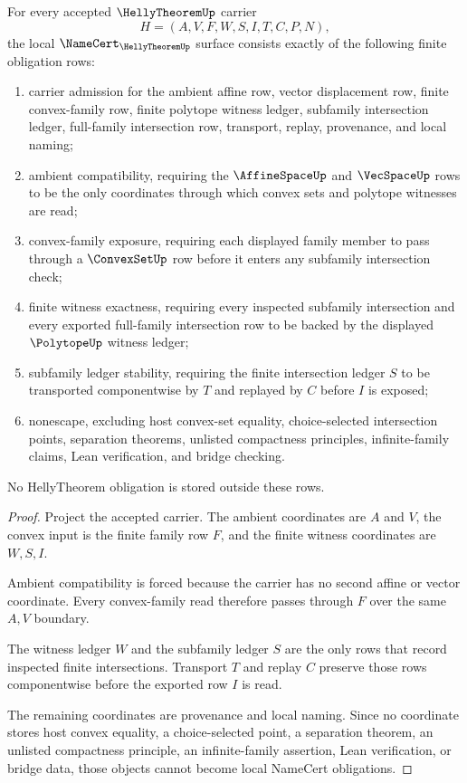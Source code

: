 \begin{theorem}\label{thm:helly-theorem-namecert-obligations}
For every accepted $\HellyTheoremUp$ carrier
$$
H=(A,V,F,W,S,I,T,C,P,N),
$$
the local $\NameCert_{\HellyTheoremUp}$ surface consists exactly of the following finite obligation rows:
\begin{enumerate}
\item carrier admission for the ambient affine row, vector displacement row, finite convex-family row, finite polytope witness ledger, subfamily intersection ledger, full-family intersection row, transport, replay, provenance, and local naming;
\item ambient compatibility, requiring the $\AffineSpaceUp$ and $\VecSpaceUp$ rows to be the only coordinates through which convex sets and polytope witnesses are read;
\item convex-family exposure, requiring each displayed family member to pass through a $\ConvexSetUp$ row before it enters any subfamily intersection check;
\item finite witness exactness, requiring every inspected subfamily intersection and every exported full-family intersection row to be backed by the displayed $\PolytopeUp$ witness ledger;
\item subfamily ledger stability, requiring the finite intersection ledger $S$ to be transported componentwise by $T$ and replayed by $C$ before $I$ is exposed;
\item nonescape, excluding host convex-set equality, choice-selected intersection points, separation theorems, unlisted compactness principles, infinite-family claims, Lean verification, and bridge checking.
\end{enumerate}
No HellyTheorem obligation is stored outside these rows.
\end{theorem}
\begin{proof}
Project the accepted carrier. The ambient coordinates are $A$ and $V$, the convex input is the finite family row $F$, and the finite witness coordinates are $W,S,I$.

Ambient compatibility is forced because the carrier has no second affine or vector coordinate. Every convex-family read therefore passes through $F$ over the same $A,V$ boundary.

The witness ledger $W$ and the subfamily ledger $S$ are the only rows that record inspected finite intersections. Transport $T$ and replay $C$ preserve those rows componentwise before the exported row $I$ is read.

The remaining coordinates are provenance and local naming. Since no coordinate stores host convex equality, a choice-selected point, a separation theorem, an unlisted compactness principle, an infinite-family assertion, Lean verification, or bridge data, those objects cannot become local NameCert obligations.
\end{proof}

